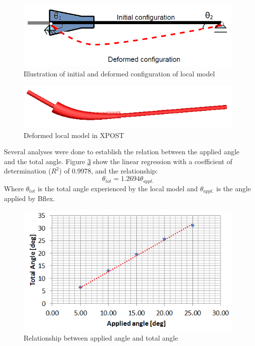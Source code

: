 \begin{figure}[H]
\centering
\includegraphics[scale=0.75]{figures/anglecorr1}
\caption[$\; \:$Initial and deformed configuration of local model]{Illustration of initial and deformed configuration of local model}
 \label{fig:anglecorr1}
\end{figure}

\begin{figure}[H]
\centering
\includegraphics[scale=0.75]{figures/anglecorrre}
\caption[$\; \:$Deformed local model in XPOST]{Deformed local model in XPOST}
 \label{fig:anglecorrre}
\end{figure}
 Several analyses were done to establish the relation between the applied angle and the total angle. Figure \ref{fig:anglerel} show the linear regression with a coefficient of determination ($R^2$) of 0.9978, and the relationship:
\begin{equation}
    \theta_{tot}=1.2694\theta_{appl.}
\label{eq:lincorr}
\end{equation}
Where $\theta_{tot}$ is the total angle experienced by the local model and $\theta_{appl.}$ is the angle applied by Bflex.
\begin{figure}[H]
\centering
\includegraphics[scale=0.8]{figures/anglerel}
\caption[$\; \:$Relationship between applied angle and total angle]{Relationship between applied angle and total angle}
 \label{fig:anglerel}
\end{figure}

